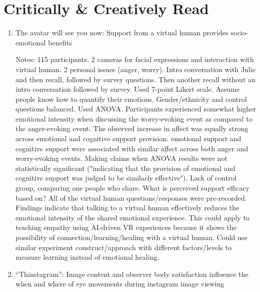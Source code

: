 \documentclass[a4paper]{article}
\begin{document}
\section{Critically \& Creatively Read}
\begin{enumerate}
    \item The avatar will see you now: Support from a virtual human provides socio-emotional benefits \cite{pauw_avatar_2022}
    
    Notes: 115 participants. 2 cameras for facial expressions and interaction with virtual human. 2 personal issues (anger, worry). Intro conversation with Julie and then recall, followed by survey questions. Then another recall without an intro conversation followed by survey. Used 7-point Likert scale. Assume people know how to quantify their emotions. Gender/ethnicity and control questions balanced. Used ANOVA. Participants experienced somewhat higher emotional intensity when discussing the worry-evoking event as compared to the anger-evoking event. The observed increase in affect was equally strong across emotional and cognitive support provision. emotional support and cognitive support were associated with similar affect across both anger and worry-evoking events. Making claims when ANOVA results were not statistically significant ("indicating that the provision of emotional and cognitive support was judged to be similarly effective"). Lack of control group, comparing one people who share. What is perceived support efficacy based on? All of the virtual human questions/responses were pre-recorded. Findings indicate that talking to a virtual human effectively reduces the emotional intensity of the shared emotional experience. This could apply to teaching empathy using AI-driven VR experiences because it shows the possibility of connection/learning/healing with a virtual human. Could use similar experiment construct/approach with different factors/levels to measure learning instead of emotional healing.
    
    \item “Thinstagram”: Image content and observer body satisfaction influence the when and where of eye movements during instagram image viewing \cite{scott_thinstagram_2023}
    

\end{enumerate}
\end{document}
